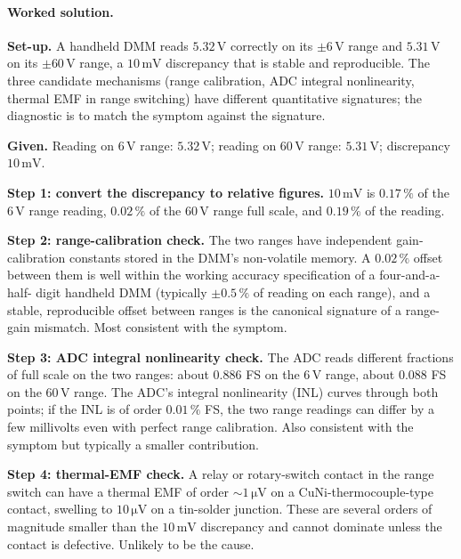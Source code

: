 \paragraph{Worked solution.}
\textbf{Set-up.} A handheld DMM reads $5.32 \,\si{\volt}$
correctly on its $\pm 6 \,\si{\volt}$ range and $5.31 \,\si
{\volt}$ on its $\pm 60 \,\si{\volt}$ range, a $10 \,\si{\milli
\volt}$ discrepancy that is stable and reproducible. The three
candidate mechanisms (range calibration, ADC integral
nonlinearity, thermal EMF in range switching) have different
quantitative signatures; the diagnostic is to match the symptom
against the signature.

\textbf{Given.} Reading on $6 \,\si{\volt}$ range: $5.32 \,\si
{\volt}$; reading on $60 \,\si{\volt}$ range: $5.31 \,\si{\volt}$;
discrepancy $10 \,\si{\milli\volt}$.

\textbf{Step 1: convert the discrepancy to relative figures.}
$10 \,\si{\milli\volt}$ is $0.17\,\%$ of the $6 \,\si{\volt}$
range reading, $0.02\,\%$ of the $60 \,\si{\volt}$ range
full scale, and $0.19\,\%$ of the reading.

\textbf{Step 2: range-calibration check.} The two ranges have
independent gain-calibration constants stored in the DMM's
non-volatile memory. A $0.02\,\%$ offset between them is well
within the working accuracy specification of a four-and-a-half-
digit handheld DMM (typically $\pm 0.5\,\%$ of reading on each
range), and a stable, reproducible offset between ranges is the
canonical signature of a range-gain mismatch. Most consistent
with the symptom.

\textbf{Step 3: ADC integral nonlinearity check.} The ADC reads
different fractions of full scale on the two ranges: about
$0.886$ FS on the $6 \,\si{\volt}$ range, about $0.088$ FS on
the $60 \,\si{\volt}$ range. The ADC's integral nonlinearity
(INL) curves through both points; if the INL is of order
$0.01\,\%$ FS, the two range readings can differ by a few
millivolts even with perfect range calibration. Also consistent
with the symptom but typically a smaller contribution.

\textbf{Step 4: thermal-EMF check.} A relay or rotary-switch
contact in the range switch can have a thermal EMF of order
$\sim 1 \,\si{\micro\volt}$ on a CuNi-thermocouple-type contact,
swelling to $10 \,\si{\micro\volt}$ on a tin-solder junction.
These are several orders of magnitude smaller than the $10 \,\si
{\milli\volt}$ discrepancy and cannot dominate unless the contact
is defective. Unlikely to be the cause.

